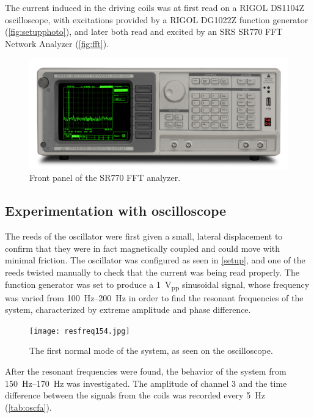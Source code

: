 \documentclass{article}
\begin{document}
The current induced in the driving coils was at first read on a RIGOL DS1104Z oscilloscope, with excitations provided by a RIGOL DG1022Z function generator (\autoref{fig:setupphoto}), and later both read and excited by an SRS SR770 FFT Network Analyzer (\autoref{fig:fft}).

\begin{figure}
  \centering
  \includegraphics[width=\linewidth]{SR770_FPlg.jpg}
  \caption{Front panel of the SR770 FFT analyzer.}
  \label{fig:fft}
\end{figure}

\subsection{Experimentation with oscilloscope}
The reeds of the oscillator were first given a small, lateral displacement to confirm that they were in fact magnetically coupled and could move with minimal friction. The oscillator was configured as seen in \autoref{setup}, and one of the reeds twisted manually to check that the current was being read properly. The function generator was set to produce a \qty{1}{V_{pp}} sinusoidal signal, whose frequency was varied from \qtyrange{100}{200}{Hz} in order to find the resonant frequencies of the system, characterized by extreme amplitude and phase difference.
\begin{figure}
  \centering
  \texttt{[image: resfreq154.jpg]}
  \caption{The first normal mode of the system, as seen on the oscilloscope.}
\end{figure}

After the resonant frequencies were found, the behavior of the system from \qtyrange{150}{170}{Hz} was investigated. The amplitude of channel 3 and the time difference between the signals from the coils was recorded every \qty{5}{Hz} (\autoref{tab:oscfa}).
\end{document}
